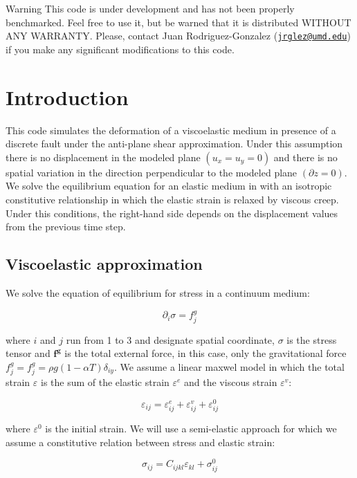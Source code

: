 \begin{DoxyWarning}{Warning}
This code is under development and has not been properly benchmarked. Feel free to use it, but be warned that it is distributed W\-I\-T\-H\-O\-U\-T A\-N\-Y W\-A\-R\-R\-A\-N\-T\-Y. Please, contact Juan Rodriguez-\/\-Gonzalez (\href{mailto:jrglez@umd.edu}{\tt jrglez@umd.\-edu}) if you make any significant modifications to this code.
\end{DoxyWarning}
\hypertarget{index_intro}{}\section{Introduction}\label{index_intro}
This code simulates the deformation of a viscoelastic medium in presence of a discrete fault under the anti-\/plane shear approximation. Under this assumption there is no displacement in the modeled plane $(u_{x}=u_{y}=0)$ and there is no spatial variation in the direction perpendicular to the modeled plane $(\partial z=0)$. We solve the equilibrium equation for an elastic medium in with an isotropic constitutive relationship in which the elastic strain is relaxed by viscous creep. Under this conditions, the right-\/hand side depends on the displacement values from the previous time step.\hypertarget{index_equations}{}\subsection{Viscoelastic approximation}\label{index_equations}
We solve the equation of equilibrium for stress in a continuum medium\-:

\[\partial_{i} \sigma = f^g_j \]

where $i$ and $j$ run from 1 to 3 and designate spatial coordinate, $\sigma$ is the stress tensor and $\boldsymbol{f^g}$ is the total external force, in this case, only the gravitational force $f^g_j=f^g_j=\rho g \left(1-\alpha T \right) \delta_{iy}$. We assume a linear maxwel model in which the total strain $ \varepsilon $ is the sum of the elastic strain $ \varepsilon^e $ and the viscous strain $ \varepsilon^v $\-:

\[ \varepsilon_{ij} = \varepsilon^e_{ij} + \varepsilon^v_{ij} + \varepsilon^0_{ij} \]

where $ \varepsilon^0 $ is the initial strain. We will use a semi-\/elastic approach \cite{zienkiewicz_cormeau_74} \cite{yamasaki_houseman_12} for which we assume a constitutive relation between stress and elastic strain\-:

\[ \sigma_{ij} = C_{ijkl} \varepsilon_{kl} + \sigma^0_{ij}\]

